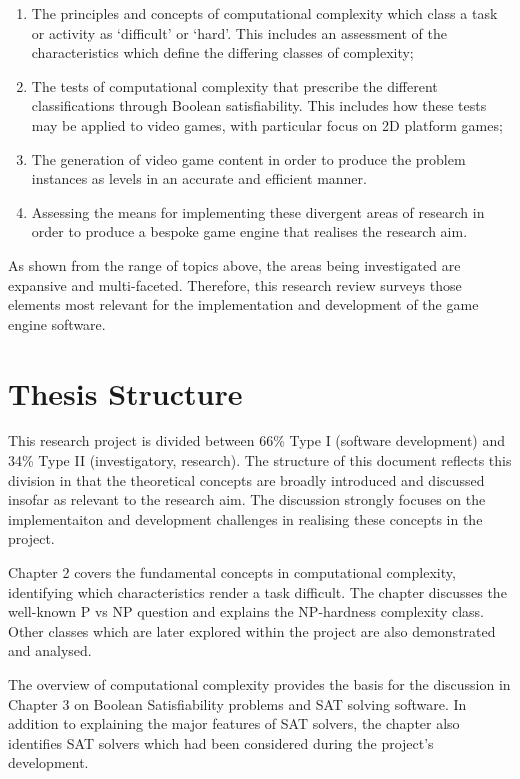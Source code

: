 \documentclass[11pt, a4paper, oneside]{report} %
\begin{document}
\begin{enumerate}

  \item The principles and concepts of computational complexity which class a task or activity as
  `difficult' or `hard'. This includes an assessment of the characteristics which define the
  differing classes of complexity;

  \item  The tests of computational complexity that prescribe the different classifications through
  Boolean satisfiability. This includes how these tests may be applied to video games, with
  particular focus on 2D platform games;

  \item The generation of video game content in order to produce the problem instances as levels in
  an accurate and efficient manner.

  \item Assessing the means for implementing these divergent areas of research in order to produce a
  bespoke game engine that realises the research aim.


\end{enumerate}

As shown from the range of topics above, the areas being investigated are
expansive and multi-faceted. Therefore, this research review surveys those
elements most relevant for the implementation and development of the game engine
software.

\section{Thesis Structure}

This research project is divided between 66\% Type I (software development) and
34\% Type II (investigatory, research). The structure of this document reflects
this division in that the theoretical concepts are broadly introduced and
discussed insofar as relevant to the research aim. The discussion strongly
focuses on the  implementaiton and development challenges in realising these
concepts in the project.

Chapter 2 covers the fundamental concepts in computational complexity,
identifying which characteristics render a task difficult. The chapter discusses
the well-known P vs NP question and explains the NP-hardness complexity class.
Other classes which are later explored within the project are also demonstrated
and analysed.

The overview of computational complexity provides the basis for the discussion
in Chapter 3 on Boolean Satisfiability problems and SAT solving software. In
addition to explaining the major features of SAT solvers, the chapter also
identifies SAT solvers which had been considered during the project's
development.
\end{document}
